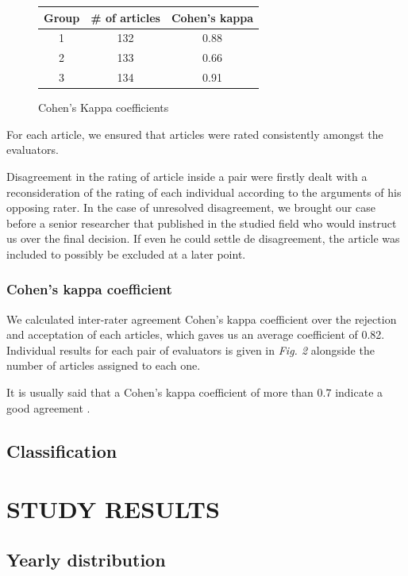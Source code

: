 \documentclass[letterpaper, 10 pt, conference]{ieeeconf}  %
\begin{document}
\begin{figure}
 \centering
  \begin{tabular}{ ccc }
   \bf Group & \bf \# of articles & \bf Cohen's kappa \\
   \hline {}
   1 & 132 & 0.88 \\
   2 & 133 & 0.66 \\
   3 & 134 & 0.91 \\
 \end{tabular}
 \caption{Cohen's Kappa coefficients}
\end{figure}

For each article, we ensured that articles were rated consistently amongst the
evaluators.

Disagreement in the rating of article inside a pair were firstly dealt with a
reconsideration of the rating of each individual according to the arguments of his opposing rater.
In the case of unresolved disagreement, we brought our case before a senior
researcher that published in the studied field who would instruct us over the final
decision.
If even he could settle de disagreement, the article was included to possibly be
excluded at a later point.


\subsubsection{Cohen's kappa coefficient}
We calculated inter-rater agreement Cohen's kappa coefficient over the
rejection and acceptation of each articles, which gaves us an average coefficient
of 0.82.
Individual results for each pair of evaluators is given in \textit{Fig. 2}
alongside the number of articles assigned to each one.

It is usually said that a Cohen's kappa coefficient of more than $0.7$ indicate
a good agreement \cite{c3}.


\subsection{Classification}


\section{STUDY RESULTS}

\subsection{Yearly distribution}
\end{document}
